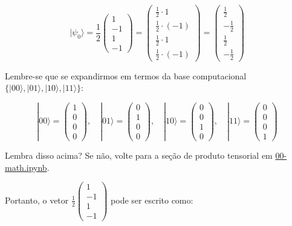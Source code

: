 \documentclass[
  brazilian,
]{report}
\begin{document}
\[|\psi_0\rangle = \frac{1}{2}\begin{pmatrix} 1 \\ -1 \\ 1 \\ -1 \end{pmatrix} = \begin{pmatrix} \frac{1}{2} \cdot 1 \\ \frac{1}{2} \cdot (-1) \\ \frac{1}{2} \cdot 1 \\ \frac{1}{2} \cdot (-1) \end{pmatrix} = \begin{pmatrix} \frac{1}{2} \\ -\frac{1}{2} \\ \frac{1}{2} \\ -\frac{1}{2} \end{pmatrix}\]

Lembre-se que se expandirmos em termos da base computacional
\(\{|00\rangle, |01\rangle, |10\rangle, |11\rangle\}\):

\[|00\rangle = \begin{pmatrix} 1 \\ 0 \\ 0 \\ 0 \end{pmatrix}, \quad |01\rangle = \begin{pmatrix} 0 \\ 1 \\ 0 \\ 0 \end{pmatrix}, \quad |10\rangle = \begin{pmatrix} 0 \\ 0 \\ 1 \\ 0 \end{pmatrix}, \quad |11\rangle = \begin{pmatrix} 0 \\ 0 \\ 0 \\ 1 \end{pmatrix}\]

Lembra disso acima? Se não, volte para a seção de produto tensorial em
\url{00-math.ipynb}.

Portanto, o vetor
\(\frac{1}{2}\begin{pmatrix} 1 \\ -1 \\ 1 \\ -1 \end{pmatrix}\) pode ser
escrito como:
\end{document}
